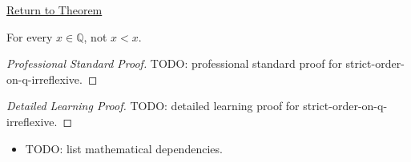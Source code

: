 \newpage
{}
\label{prf:strict-order-on-q-irreflexive}

\begin{remark*}[Return]
\hyperref[thm:strict-order-on-q-irreflexive]{Return to Theorem}
\end{remark*}

\begin{theorem*}
For every $x\in\mathbb{Q}$, not $x<x$.
\end{theorem*}

\begin{proof}[Professional Standard Proof]
\LRAProofBodyStart
TODO: professional standard proof for strict-order-on-q-irreflexive.
\end{proof}

\begin{proof}[Detailed Learning Proof]
\LRAProofBodyStart
TODO: detailed learning proof for strict-order-on-q-irreflexive.
\end{proof}

\begin{remark*}
\end{remark*}

\begin{dependencies}
\begin{itemize}
  \item TODO: list mathematical dependencies.
\end{itemize}
\end{dependencies}

\clearpage
